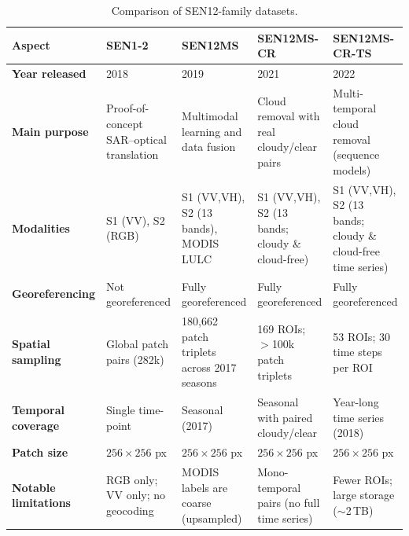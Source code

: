 \begin{table}[!h]
    \centering
    \caption{Comparison of SEN12-family datasets.}
    \label{tab:sen12_datasets}
    \setlength{\tabcolsep}{4pt} %
    \renewcommand{\arraystretch}{1.15} %
    \begin{adjustbox}{max width=\textwidth, keepaspectratio=false}
    \begin{tabular}{P{2.6cm} P{3.4cm} P{3.4cm} P{3.6cm} P{3.6cm}}
        \toprule
        \textbf{Aspect} &
        \textbf{SEN1-2}~\cite{sen12_2018} &
        \textbf{SEN12MS}~\cite{sen12ms_2019} &
        \textbf{SEN12MS-CR}~\cite{sen12ms-cr_2021} &
        \textbf{SEN12MS-CR-TS}~\cite{sen12ms-cr-ts_2022} \\
        \midrule
        \textbf{Year released} &
        2018 & 2019 & 2021 & 2022 \\
        \addlinespace[6pt]
        \textbf{Main purpose} &
        Proof-of-concept SAR–optical translation &
        Multimodal learning and data fusion &
        Cloud removal with real cloudy/clear pairs &
        Multi-temporal cloud removal (sequence models) \\
        \addlinespace[6pt]
        \textbf{Modalities} &
        S1 (VV), S2 (RGB) &
        S1 (VV,VH), S2 (13 bands), MODIS LULC &
        S1 (VV,VH), S2 (13 bands; cloudy \& cloud-free) &
        S1 (VV,VH), S2 (13 bands; cloudy \& cloud-free time series) \\
        \addlinespace[6pt]
        \textbf{Georeferencing} &
        Not georeferenced &
        Fully georeferenced &
        Fully georeferenced &
        Fully georeferenced \\
        \addlinespace[6pt]
        \textbf{Spatial sampling} &
        Global patch pairs (282k) &
        180,662 patch triplets across 2017 seasons &
        169 ROIs; $>$100k patch triplets &
        53 ROIs; 30 time steps per ROI \\
        \addlinespace[6pt]
        \textbf{Temporal coverage} &
        Single time-point &
        Seasonal (2017) &
        Seasonal with paired cloudy/clear &
        Year-long time series (2018) \\
        \addlinespace[6pt]
        \textbf{Patch size} &
        $256\times256$ px &
        $256\times256$ px &
        $256\times256$ px &
        $256\times256$ px \\
        \addlinespace[6pt]
        \textbf{Notable limitations} &
        RGB only; VV only; no geocoding &
        MODIS labels are coarse (upsampled) &
        Mono-temporal pairs (no full time series) &
        Fewer ROIs; large storage ($\sim$2\,TB) \\
        \bottomrule
    \end{tabular}
    \end{adjustbox}
\end{table}

